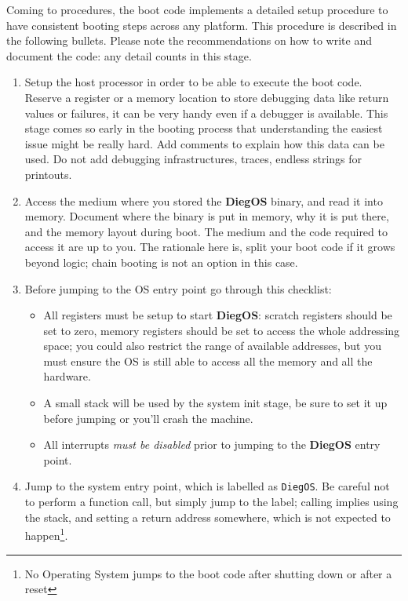\documentclass[11pt,b5paper]{scrbook}
\newcommand{\myOS}{{\color{SteelBlue}\textbf{DiegOS}}}
\begin{document}
Coming to procedures, the boot code implements a detailed setup procedure to have consistent 
booting steps across any platform.
This procedure is described in the following bullets.
Please note the recommendations on how to write and document the code: any detail counts in this stage.

\begin{enumerate}
\item Setup the host processor in order to be able to execute the boot code.
Reserve a register or a memory location to store debugging data like return 
values or failures, it can be very handy even if a debugger is available.
This stage comes so early in the booting process that understanding the
easiest issue might be really hard.
Add comments to explain how this data can be used.
Do not add debugging infrastructures, traces, endless strings for printouts.
\item Access the medium where you stored the {\myOS} binary, and read it into
memory. Document where the binary is put in memory, why it is put there, and
the memory layout during boot. The medium and the code required to
access it are up to you. The rationale here is, split your boot code if it grows beyond
logic; chain booting is not an option in this case.
\item Before jumping to the OS entry point go through this checklist:
\hfill
\begin{tcolorbox}[enhanced, colframe=CadetBlue!80!White, leftrule=3mm, top=5mm, bottom=5mm, halign=center, drop fuzzy shadow]
    \begin{itemize}
    \item All registers must be setup to start {\myOS}: scratch registers should be
    set to zero, memory registers should be set to access the whole addressing
    space; you could also restrict the range of available addresses, but you 
    must ensure the OS is still able to access all the memory and all the hardware.
    \item A small stack will be used by the system init stage, be sure to set
    it up before jumping or you'll crash the machine.
    \item All interrupts \textit{must be disabled} prior to jumping to the
    {\myOS} entry point. 
    \end{itemize}
\end{tcolorbox}
\item Jump to the system entry point, which is labelled as \texttt{DiegOS}.
Be careful not to perform a function call, but simply jump to the label;
calling implies using the stack, and setting a return address somewhere, which
is not expected to happen\footnote{No Operating System jumps to the boot
code after shutting down or after a reset}.
\end{enumerate}
\end{document}
